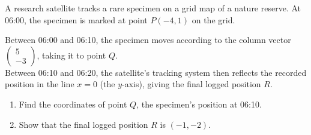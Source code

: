\begin{question}
\noindent A research satellite tracks a rare specimen on a grid map of a nature reserve.
At 06:00, the specimen is marked at point $P(-4, 1)$ on the grid.

\begin{center}
\end{center}

\noindent Between 06:00 and 06:10, the specimen moves according to the column vector
$\begin{pmatrix} 5 \\ -3 \end{pmatrix}$, taking it to point $Q$.\\
Between 06:10 and 06:20, the satellite's tracking system then reflects the recorded position in the line $x = 0$ (the $y$-axis), giving the final logged position $R$.

\begin{enumerate}
    \item[(a)] Find the coordinates of point $Q$, the specimen's position at 06:10.

    \vspace{3cm}

    \item[(b)] Show that the final logged position $R$ is $(-1, -2)$.

    \vspace{3.5cm}
\end{enumerate}
\end{question}
